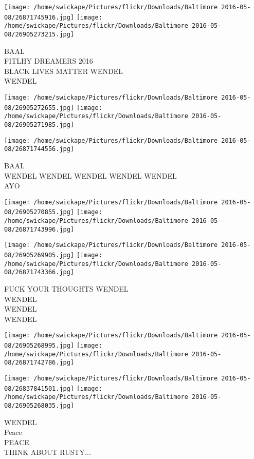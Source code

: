 \documentclass[10pt,letterpaper]{article}
\begin{document}
\texttt{[image: /home/swickape/Pictures/flickr/Downloads/Baltimore 2016-05-08/26871745916.jpg]}
\texttt{[image: /home/swickape/Pictures/flickr/Downloads/Baltimore 2016-05-08/26905273215.jpg]}

BAAL\\
FITLHY DREAMERS 2016\\
BLACK LIVES MATTER WENDEL\\
WENDEL\\
\pagebreak

\texttt{[image: /home/swickape/Pictures/flickr/Downloads/Baltimore 2016-05-08/26905272655.jpg]}
\texttt{[image: /home/swickape/Pictures/flickr/Downloads/Baltimore 2016-05-08/26905271985.jpg]}

\vspace{0.25in}
\texttt{[image: /home/swickape/Pictures/flickr/Downloads/Baltimore 2016-05-08/26871744556.jpg]}

BAAL\\
WENDEL WENDEL WENDEL WENDEL WENDEL\\
AYO\\
\pagebreak

\texttt{[image: /home/swickape/Pictures/flickr/Downloads/Baltimore 2016-05-08/26905270855.jpg]}
\texttt{[image: /home/swickape/Pictures/flickr/Downloads/Baltimore 2016-05-08/26871743996.jpg]}

\texttt{[image: /home/swickape/Pictures/flickr/Downloads/Baltimore 2016-05-08/26905269905.jpg]}
\texttt{[image: /home/swickape/Pictures/flickr/Downloads/Baltimore 2016-05-08/26871743366.jpg]}

FUCK YOUR THOUGHTS WENDEL\\
WENDEL\\
WENDEL\\
WENDEL\\
\pagebreak

\texttt{[image: /home/swickape/Pictures/flickr/Downloads/Baltimore 2016-05-08/26905268995.jpg]}
\texttt{[image: /home/swickape/Pictures/flickr/Downloads/Baltimore 2016-05-08/26871742786.jpg]}

\texttt{[image: /home/swickape/Pictures/flickr/Downloads/Baltimore 2016-05-08/26837841501.jpg]}
\texttt{[image: /home/swickape/Pictures/flickr/Downloads/Baltimore 2016-05-08/26905268035.jpg]}

WENDEL\\
Peace\\
PEACE\\
THINK ABOUT RUSTY...\\
\pagebreak
\end{document}
